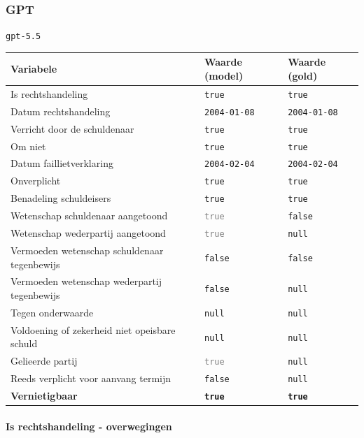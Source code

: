 \documentclass[
  dutch,
  a4paper,
]{article}
\begin{document}
\newpage


\subsubsection{GPT}\label{gpt-15}

\texttt{gpt-5.5}

\begin{center}
\small
\begin{tabular}{@{}p{7.4cm}p{2.6cm}p{2.6cm}@{}}
\toprule
Variabele & Waarde (model) & Waarde (gold) \\
\midrule
Is rechtshandeling & \texttt{true} & \texttt{true} \\
Datum rechtshandeling & \texttt{2004-01-08} & \texttt{2004-01-08} \\
Verricht door de schuldenaar & \texttt{true} & \texttt{true} \\
Om niet & \texttt{true} & \texttt{true} \\
Datum faillietverklaring & \texttt{2004-02-04} & \texttt{2004-02-04} \\
Onverplicht & \texttt{true} & \texttt{true} \\
Benadeling schuldeisers & \texttt{true} & \texttt{true} \\
Wetenschap schuldenaar aangetoond & \textcolor{gray}{\texttt{true}} & \texttt{false} \\
Wetenschap wederpartij aangetoond & \textcolor{gray}{\texttt{true}} & \texttt{null} \\
Vermoeden wetenschap schuldenaar tegenbewijs & \texttt{false} & \texttt{false} \\
Vermoeden wetenschap wederpartij tegenbewijs & \texttt{false} & \texttt{null} \\
Tegen onderwaarde & \texttt{null} & \texttt{null} \\
Voldoening of zekerheid niet opeisbare schuld & \texttt{null} & \texttt{null} \\
Gelieerde partij & \textcolor{gray}{\texttt{true}} & \texttt{null} \\
Reeds verplicht voor aanvang termijn & \texttt{false} & \texttt{null} \\
\textbf{Vernietigbaar} & \textbf{\texttt{true}} & \textbf{\texttt{true}} \\
\bottomrule
\end{tabular}
\end{center}

\paragraph{Is rechtshandeling - overwegingen}\label{is-rechtshandeling---overwegingen-46}
\end{document}
